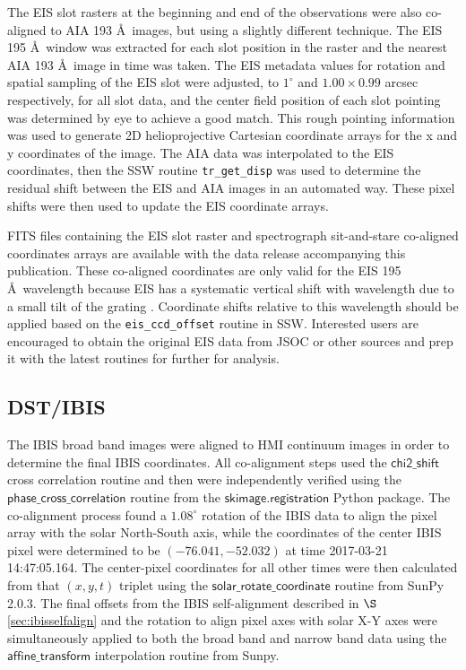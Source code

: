 \documentclass[twocolumn]{aastex62}
\newcommand{\code}[1]{\ensuremath{\textsf{#1}}}
\newcommand{\secref}[1]{$\S$\ref{#1}}
\begin{document}
The EIS slot rasters at the beginning and end of the observations were also co-aligned to AIA 193 \AA\ images, but using a slightly different technique.  The EIS 195 \AA\ window was extracted for each slot position in the raster and the nearest AIA 193 \AA\ image in time was taken.  The EIS metadata values for rotation and spatial sampling of the EIS slot were adjusted, to $1^\circ$ and $1.00 \times 0.99$ arcsec respectively, for all slot data, and the center field position of each slot pointing was determined by eye to achieve a good match.  This rough pointing information was used to generate 2D helioprojective Cartesian coordinate arrays for the x and y coordinates of the image.  The AIA data was interpolated to the EIS coordinates, then the SSW routine \verb+tr_get_disp+ was used to determine the residual shift between the EIS and AIA images in an automated way.  These pixel shifts were then used to update the EIS coordinate arrays.

FITS files containing the EIS slot raster and spectrograph sit-and-stare co-aligned coordinates arrays are available with the data release accompanying this publication.  These co-aligned coordinates are only valid for the EIS 195 \AA\ wavelength because EIS has a systematic vertical shift with wavelength due to a small tilt of the grating \citep[e.g.][]{young09}.  Coordinate shifts relative to this wavelength should be applied based on the \verb+eis_ccd_offset+ routine in SSW.  Interested users are encouraged to obtain the original EIS data from JSOC or other sources and prep it with the latest routines for further for analysis.


\subsection{DST/IBIS}
The IBIS broad band images were aligned to HMI continuum images in order to determine the final IBIS coordinates.
All co-alignment steps used the \code{chi2\_shift} cross correlation routine and then were independently verified using the \code{phase\_cross\_correlation} routine from the \code{skimage.registration} Python package.
The co-alignment process found a $1.08^\circ$ rotation of the IBIS data to align the pixel array with the solar North-South axis, while the coordinates of the center IBIS pixel were determined to be $(-76.041, -52.032)$ at time 2017-03-21 14:47:05.164.
The center-pixel coordinates for all other times were then calculated from that $(x,y,t)$ triplet using the \code{solar\_rotate\_coordinate} routine from SunPy 2.0.3.
The final offsets from the IBIS self-alignment described in \secref{sec:ibisselfalign} and the rotation to align pixel axes with solar X-Y axes were simultaneously applied to both the broad band and narrow band data using the \code{affine\_transform} interpolation routine from Sunpy. 
\end{document}
